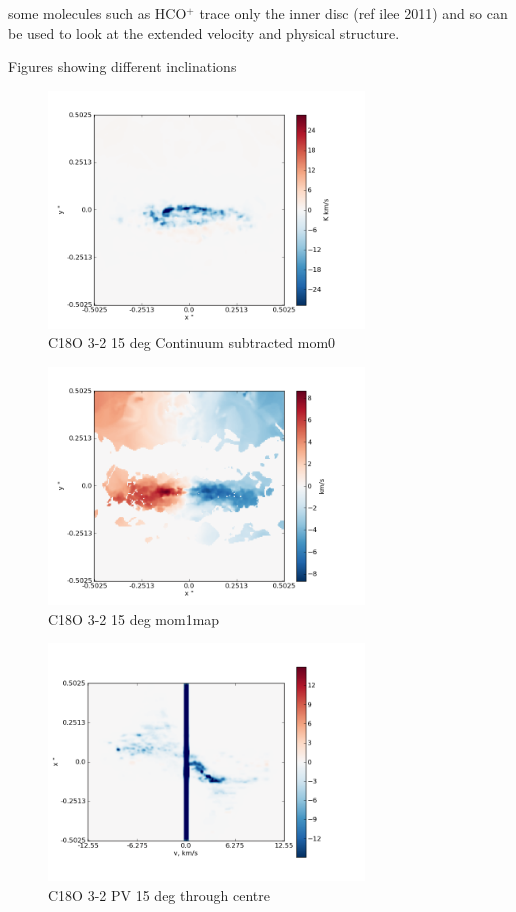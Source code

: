 \documentclass[useAMS,usenatbib]{mn2e}
\begin{document}
some molecules such as HCO$^+$ trace only the inner disc (ref ilee 2011) and so can be used to look at the extended velocity and physical structure.\newline


Figures showing different inclinations  
\begin{figure}
 \includegraphics[width=84mm]{Figures/sim/imageC18O_3-2_15deg_contSub.png}

 \caption{C18O 3-2 15 deg Continuum subtracted mom0}
\end{figure}

\begin{figure}
 \includegraphics[width=84mm]{Figures/sim/imageC18O_3-2_15deg_mom1.png}

 \caption{C18O 3-2 15 deg mom1map}
\end{figure}

\begin{figure}
 \includegraphics[width=84mm]{Figures/sim/imageC18O_3-2_15deg_PV_centre.png}

 \caption{C18O 3-2 PV 15 deg through centre}
\end{figure}
\end{document}
